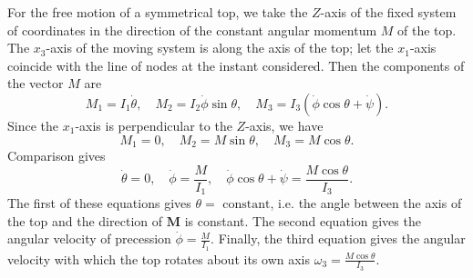 For the free motion of a symmetrical top, we take the $Z$-axis of the fixed system of coordinates in the direction of the constant angular momentum $M$ of the top. The $x_3$-axis of the moving system is along the axis of the top; let the $x_1$-axis coincide with the line of nodes at the instant considered. 
Then the components of the vector $M$ are
\[M_1 = I_1\dot{\theta} ,\quad M_2 = I_2 \dot{\phi}\sin\theta ,\quad M_3 = I_3(\dot{\phi}\cos\theta + \dot{\psi}).\]
Since the $x_1$-axis is perpendicular to the $Z$-axis, we have
\[M_1 = 0 ,\quad M_2 = M\sin\theta ,\quad M_3 = M\cos\theta.\]
Comparison gives
\[\dot{\theta} = 0 ,\quad  \dot{\phi} = \frac{M}{I_1} ,\quad \dot{\phi}\cos\theta + \dot{\psi} = \frac{M\cos\theta}{I_3}.\]
The first of these equations gives $\theta = \mbox{ constant} $, i.e. the angle between the axis of the top and the direction of $\bm{M}$ is constant. The second equation gives
the angular velocity of precession $\dot{\phi} = \frac{M}{I_1}$. Finally, the third equation gives the angular velocity with which the top rotates about its own axis $\omega_3 = \frac{M\cos\theta}{I_3}$.